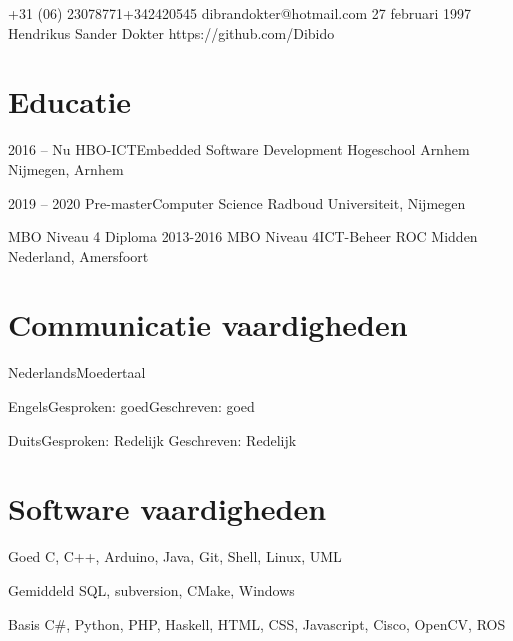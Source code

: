 \documentclass{tccv}
\begin{document}
    {+31 (06) 23078771\newline+342420545}
    {dibrandokter@hotmail.com}
   	{27 februari 1997}
	{Hendrikus Sander Dokter}
    {https://github.com/Dibido}
\section{Educatie}

\begin{yearlist}

\item{2016 -- Nu}
     {HBO-ICT\newline Embedded Software Development}
     {Hogeschool Arnhem Nijmegen, Arnhem}
     
\item{2019 -- 2020}
	 {Pre-master\newline Computer Science}
	 {Radboud Universiteit, Nijmegen}

\item[MBO Niveau 4 Diploma]{2013-2016}
     {MBO Niveau 4\newline ICT-Beheer}
     {ROC Midden Nederland, Amersfoort}

\end{yearlist}

\section{Communicatie vaardigheden}

\begin{factlist}
\item{Nederlands}{Moedertaal}
\item{Engels}{Gesproken: goed\newline Geschreven: goed}
\item{Duits}{Gesproken: Redelijk \newline Geschreven: Redelijk}
\end{factlist}

\section{Software vaardigheden}

\begin{factlist}

\item{Goed}
     {C, C++, Arduino, Java, Git, Shell, Linux, UML}

\item{Gemiddeld}
     {SQL, subversion, CMake, Windows}

\item{Basis}
     {C\#, Python, PHP, Haskell, HTML, CSS, Javascript, Cisco, OpenCV, ROS}

\end{factlist}
\end{document}
